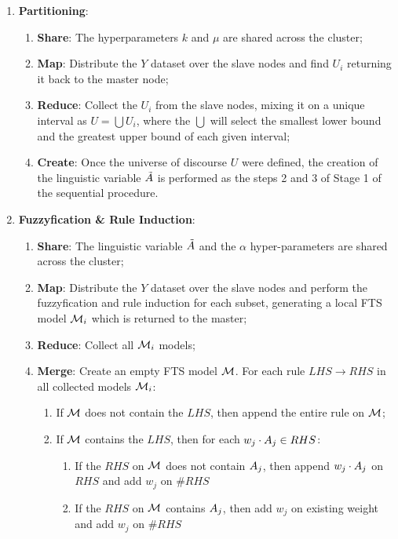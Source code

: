 \begin{enumerate}
    \item \textbf{Partitioning}:
    \begin{enumerate}
        \item \textbf{Share}: The hyperparameters $k$ and $\mu$ are shared across the cluster; 
        \item \textbf{Map}: Distribute the $Y$ dataset over the slave nodes and find $U_i$ returning it back to the master node;
        \item \textbf{Reduce}: Collect the $U_i$ from the slave nodes, mixing it on a unique interval as $U = \bigcup U_i$, where the $\bigcup$ will select the smallest lower bound and the greatest upper bound of each given interval;
        \item \textbf{Create}: Once the universe of discourse $U$ were defined, the creation of the linguistic variable $\tilde{A}$ is performed as the steps 2 and 3 of Stage 1 of the sequential procedure. 
    \end{enumerate}
    
    \item \textbf{Fuzzyfication \& Rule Induction}:
    \begin{enumerate}
        \item \textbf{Share}: The linguistic variable $\tilde{A}$ and the $\alpha$ hyper-parameters are shared across the cluster;
        \item \textbf{Map}: Distribute the $Y$ dataset over the slave nodes and perform the fuzzyfication and rule induction for each subset, generating a local FTS model $\mathcal{M}_i$ which is returned to the master; 
        \item \textbf{Reduce}: Collect all $\mathcal{M}_i$ models; 
        \item \textbf{Merge}: Create an empty FTS model $\mathcal{M}$. For each rule $LHS \rightarrow RHS$ in all collected models $\mathcal{M}_i$:
        \begin{enumerate}
            \item If $\mathcal{M}$ does not contain the $LHS$, then append the entire rule on $\mathcal{M}$;
            \item If $\mathcal{M}$ contains the $LHS$, then for each $w_j \cdot A_j \in RHS$:
            \begin{enumerate}
            \item If the $RHS$ on $\mathcal{M}$ does not contain $A_j$, then append $w_j \cdot A_j$ on $RHS$ and add $w_j$ on $\#RHS$
            \item If the $RHS$ on $\mathcal{M}$ contains $A_j$, then add $w_j$ on existing weight and add $w_j$ on $\#RHS$
            \end{enumerate}
        \end{enumerate}
    \end{enumerate}
\end{enumerate}



